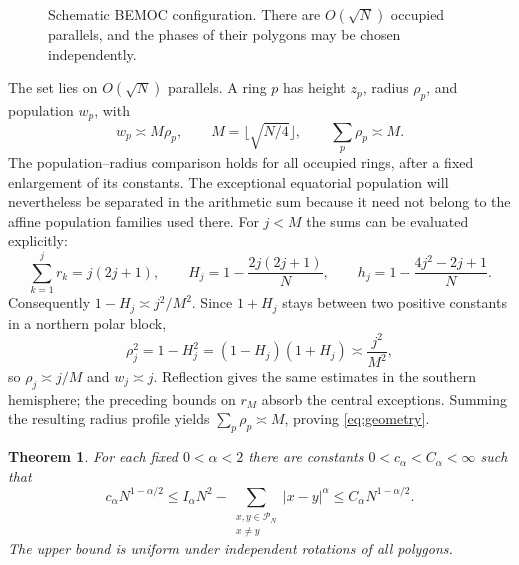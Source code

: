 \documentclass[11pt]{amsart}
\newtheorem{theorem}{Theorem}
\newcommand{\cP}{\mathcal P}
\begin{document}
\begin{figure}[t]
\centering
{}
\caption{Schematic BEMOC configuration.  There are $O(\sqrt N)$ occupied
parallels, and the phases of their polygons may be chosen independently.}
\label{fig:bemoc}
\end{figure}

The set lies on $O(\sqrt N)$ parallels.  A ring $p$ has height
$z_p$, radius $\rho_p$, and population $w_p$, with
\begin{equation}\label{eq:geometry}
 w_p\asymp M\rho_p,\qquad M=\lfloor\sqrt{N/4}\rfloor,
 \qquad \sum_p\rho_p\asymp M.                       \tag{1.3}
\end{equation}
The population--radius comparison holds for all occupied rings, after a
fixed enlargement of its constants.  The exceptional equatorial population
will nevertheless be separated in the arithmetic sum because it need not
belong to the affine population families used there.
For $j<M$ the sums can be evaluated explicitly:
\[
 \sum_{k=1}^jr_k=j(2j+1),\qquad
 H_j=1-\frac{2j(2j+1)}N,\qquad
 h_j=1-\frac{4j^2-2j+1}{N}.
\]
Consequently $1-H_j\asymp j^2/M^2$.  Since
$1+H_j$ stays between two positive constants in a northern polar block,
\[
 \rho_j^2=1-H_j^2=(1-H_j)(1+H_j)\asymp\frac{j^2}{M^2},
\]
so $\rho_j\asymp j/M$ and $w_j\asymp j$.  Reflection gives the same
estimates in the southern hemisphere; the preceding bounds on $r_M$ absorb
the central exceptions.  Summing the resulting radius profile yields
$\sum_p\rho_p\asymp M$, proving \eqref{eq:geometry}.

\begin{theorem}\label{thm:main}
For each fixed $0<\alpha<2$ there are constants
$0<c_\alpha<C_\alpha<\infty$ such that
\[
 c_\alpha N^{1-\alpha/2}
 \le I_\alpha N^2-
 \sum_{\substack{x,y\in\cP_N\\x\ne y}}|x-y|^\alpha
 \le C_\alpha N^{1-\alpha/2}.
\]
The upper bound is uniform under independent rotations of all polygons.
\end{theorem}
\end{document}
